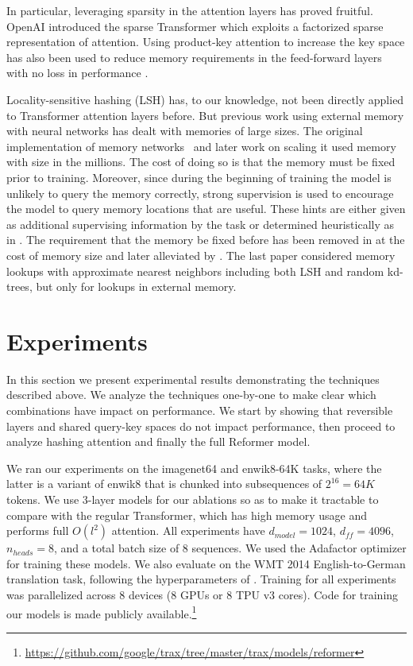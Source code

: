 \documentclass{article} %
\begin{document}
In particular, leveraging sparsity in the attention layers has proved fruitful. OpenAI introduced
the sparse Transformer \citep{child2019sparsetransformer} which exploits a factorized sparse 
representation of attention.  Using product-key attention to increase the key space has also been used to reduce memory requirements in the feed-forward layers with no loss in performance 
\citep{lample2019productkeys}.

Locality-sensitive hashing (LSH) has, to our knowledge, not been directly applied to 
Transformer attention layers before. But previous work using external memory with neural networks has
dealt with memories of large sizes.  The original implementation of memory networks~\citep{mem_nets} and later work on scaling it \citep{large_mem_nets, hier_mem_nets} used memory with size in the millions.  The cost of doing so is that the memory must be fixed prior to training. Moreover, since during the beginning of training the model is unlikely to query the memory correctly, strong supervision is used to encourage the model to query memory locations that are useful. These hints are either given as additional supervising information by the  task or determined heuristically as in \citet{goldilocks}.
The requirement that the memory be fixed before has been removed in
\citet{santoro16} at the cost of memory size and later alleviated by \citet{jack_rae}. The last paper considered memory lookups with approximate nearest neighbors including both LSH and random kd-trees, but only for lookups in external memory.



\section{Experiments} \label{sec:exp}

In this section we present experimental results demonstrating the techniques
described above. We analyze the techniques one-by-one to make clear which
combinations have impact on performance. We start by showing that reversible
layers and shared query-key spaces do not impact performance, then proceed 
to analyze hashing attention and finally the full Reformer model.

We ran our experiments on the imagenet64 and enwik8-64K tasks, where the latter is a variant of enwik8 that is chunked into subsequences of $2^{16} = 64K$ tokens. We use 3-layer models for our ablations so as to make it tractable to compare with the regular Transformer, which has high memory usage and performs full $O(l^2)$ attention. All experiments have $d_{model}=1024$, $d_{ff}=4096$, $n_{heads}=8$, and a total batch size of 8 sequences. We used the Adafactor optimizer \citep{adafactor} for training these models. We also evaluate on the WMT 2014 English-to-German translation task, following the hyperparameters of \citet{transformer}. Training for all experiments was parallelized across 8 devices (8 GPUs or 8 TPU v3 cores). Code for training our models is made publicly available.\footnote{\url{https://github.com/google/trax/tree/master/trax/models/reformer}}
\end{document}

